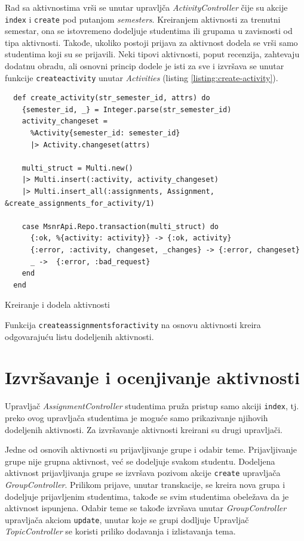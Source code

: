 \documentclass[12pt,oneside]{memoir}
\begin{document}
Rad sa aktivnostima vrši se unutar upravljča \emph{ActivityController} čije su akcije \texttt{index} i \texttt{create}
pod putanjom \emph{semesters}. Kreiranjem aktivnosti za trenutni semestar, ona se istovremeno dodeljuje studentima ili
grupama u zavisnosti od tipa aktivnosti. Takođe, ukoliko postoji prijava za aktivnost dodela se vrši samo studentima koji su
se prijavili. Neki tipovi aktivnosti, poput recenzija, zahtevaju dodatnu obradu, ali osnovni princip dodele je isti za sve i
izvršava se unutar funkcije \texttt{create{\textunderscore}activity}  unutar \emph{Activities} (listing \ref{listing:create-activity}). 
\begin{listing}[h!]
\begin{verbatim}
  def create_activity(str_semester_id, attrs) do
    {semester_id, _} = Integer.parse(str_semester_id)
    activity_changeset =
      %Activity{semester_id: semester_id}
      |> Activity.changeset(attrs)

    multi_struct = Multi.new()
    |> Multi.insert(:activity, activity_changeset)
    |> Multi.insert_all(:assignments, Assignment, &create_assignments_for_activity/1)

    case MsnrApi.Repo.transaction(multi_struct) do
      {:ok, %{activity: activity}} -> {:ok, activity}
      {:error, :activity, changeset, _changes} -> {:error, changeset}
      _ ->  {:error, :bad_request}
    end
  end
\end{verbatim}
\caption{Kreiranje i dodela aktivnosti}
\label{listing:create-activity}
\end{listing}

Funkcija \texttt{create{\textunderscore}assignments{\textunderscore}for{\textunderscore}activity} na osnovu aktivnosti
kreira odgovarajuću listu dodeljenih aktivnosti.
\section{Izvršavanje i ocenjivanje aktivnosti}

Upravljač \emph{AssignmentController} studentima pruža pristup samo akciji \texttt{index}, tj. preko ovog upravljača
studentima je moguće samo prikazivanje njihovih dodeljenih aktivnosti. Za izvršavanje aktivnosti kreirani su drugi upravljači.

Jedne od osnovih aktivnosti su prijavljivanje grupe i odabir teme. Prijavljivanje grupe nije grupna aktivnost, već se dodeljuje svakom
studentu. Dodeljena aktivnost prijavljivanja grupe se izvršava pozivom akcije \texttt{create} upravljača \emph{GroupController}.
Prilikom prijave, unutar transkacije, se kreira nova grupa i dodeljuje prijavljenim studentima, takođe se svim studentima
obeležava da je aktivnost ispunjena. Odabir teme se takođe izvršava unutar \emph{GroupController} upravljača akciom
\texttt{update}, unutar koje se grupi dodljuje  Upravljač \emph{TopicController} se koristi priliko dodavanja i izlistavanja tema.
\end{document}
